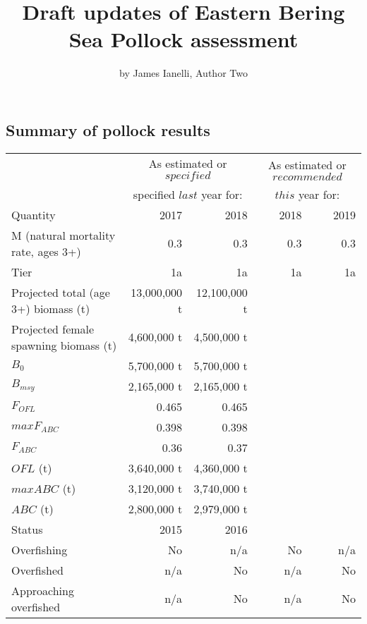 \title{Draft updates of Eastern Bering Sea Pollock assessment}
\author{by James Ianelli, Author Two}

\maketitle



\hypertarget{summary-of-pollock-results}{%
\subsection{Summary of pollock
results}\label{summary-of-pollock-results}}

\begin{table}[ht]
\centering
\begin{tabular}{lrrrr}
  \hline
       & \multicolumn{2}{c}{As estimated or $\mathit{specified}$ } & \multicolumn{2}{c}{As estimated or $\mathit{recommended}$ }  \\
       & \multicolumn{2}{c}{specified $\mathit{last}$ year for:}  & \multicolumn{2}{c}{$\mathit{this}$ year for: }               \\
        Quantity & 2017      &2018   & 2018      &2019 \\ 
  \hline
    M (natural mortality rate, ages 3+) &   0.3 &   0.3 &   0.3 &   0.3 \\
Tier    &   1a  &   1a  &   1a  &   1a \\
Projected total (age 3+) biomass (t)    &   13,000,000 t    &   12,100,000 t    &       &    \\
Projected female spawning biomass (t) & 4,600,000 t &   4,500,000 t &       &    \\
$B_0$                                 & 5,700,000 t &   5,700,000 t &       &    \\
$B_{msy}$                             & 2,165,000 t &   2,165,000 t &       &    \\
$F_{OFL}$                             & 0.465   &   0.465   &       &    \\
$maxF_{ABC}$                        &   0.398   &   0.398   &       &    \\
$F_{ABC}$ & 0.36    &   0.37    &       &    \\
$OFL$ (t)   &   3,640,000 t &   4,360,000 t &       &    \\
$maxABC$ (t)    &   3,120,000 t &   3,740,000 t &       &    \\
$ABC$ (t)   &   2,800,000 t &   2,979,000 t &       &    \\
Status  &   2015    &   2016    &       &    \\
Overfishing &   No  &   n/a &   No  &   n/a \\
Overfished  &   n/a &   No  &   n/a &   No \\
Approaching overfished  &   n/a &   No  &   n/a &   No \\
\hline
\end{tabular}
\end{table}

